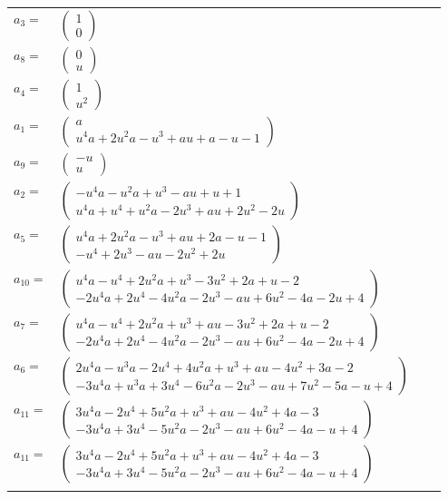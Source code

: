 \documentclass[1p]{elsarticle_modified}
\theoremstyle{definition}
\begin{document}
\begin{tabular}{m{7pt} m{180pt} m{7pt} m{180pt} }
\flushright $a_{3}=$&$\begin{pmatrix}1\\0\end{pmatrix}$ \\
\flushright $a_{8}=$&$\begin{pmatrix}0\\u\end{pmatrix}$ \\
\flushright $a_{4}=$&$\begin{pmatrix}1\\u^2\end{pmatrix}$ \\
\flushright $a_{1}=$&$\begin{pmatrix}a\\u^4 a+2 u^2 a- u^3+a u+a- u-1\end{pmatrix}$ \\
\flushright $a_{9}=$&$\begin{pmatrix}- u\\u\end{pmatrix}$ \\
\flushright $a_{2}=$&$\begin{pmatrix}- u^4 a- u^2 a+u^3- a u+u+1\\u^4 a+u^4+u^2 a-2 u^3+a u+2 u^2-2 u\end{pmatrix}$ \\
\flushright $a_{5}=$&$\begin{pmatrix}u^4 a+2 u^2 a- u^3+a u+2 a- u-1\\- u^4+2 u^3- a u-2 u^2+2 u\end{pmatrix}$ \\
\flushright $a_{10}=$&$\begin{pmatrix}u^4 a- u^4+2 u^2 a+u^3-3 u^2+2 a+u-2\\-2 u^4 a+2 u^4-4 u^2 a-2 u^3- a u+6 u^2-4 a-2 u+4\end{pmatrix}$ \\
\flushright $a_{7}=$&$\begin{pmatrix}u^4 a- u^4+2 u^2 a+u^3+a u-3 u^2+2 a+u-2\\-2 u^4 a+2 u^4-4 u^2 a-2 u^3- a u+6 u^2-4 a-2 u+4\end{pmatrix}$ \\
\flushright $a_{6}=$&$\begin{pmatrix}2 u^4 a- u^3 a-2 u^4+4 u^2 a+u^3+a u-4 u^2+3 a-2\\-3 u^4 a+u^3 a+3 u^4-6 u^2 a-2 u^3- a u+7 u^2-5 a- u+4\end{pmatrix}$ \\
\flushright $a_{11}=$&$\begin{pmatrix}3 u^4 a-2 u^4+5 u^2 a+u^3+a u-4 u^2+4 a-3\\-3 u^4 a+3 u^4-5 u^2 a-2 u^3- a u+6 u^2-4 a- u+4\end{pmatrix}$\\ \flushright $a_{11}=$&$\begin{pmatrix}3 u^4 a-2 u^4+5 u^2 a+u^3+a u-4 u^2+4 a-3\\-3 u^4 a+3 u^4-5 u^2 a-2 u^3- a u+6 u^2-4 a- u+4\end{pmatrix}$\\&\end{tabular}
\end{document}
